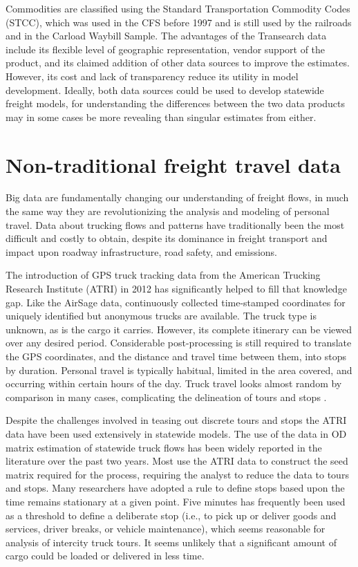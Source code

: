 Commodities are classified using the Standard Transportation Commodity Codes (STCC), which was used in the CFS before 1997 and is still used by the railroads and in the Carload Waybill Sample. The advantages of the Transearch data include its flexible level of geographic representation, vendor support of the product, and its claimed addition of other data sources to improve the estimates. However, its cost and lack of transparency reduce its utility in model development. Ideally, both data sources could be used to develop statewide freight models, for understanding the differences between the two data products may in some cases be more revealing than singular estimates from either.

\section{Non-traditional freight travel data}\label{sec:nontraditional-freight}

Big data are fundamentally changing our understanding of freight flows, in much the same way they are revolutionizing the analysis and modeling of personal travel. Data about trucking flows and patterns have traditionally been the most difficult and costly to obtain, despite its dominance in freight transport and impact upon roadway infrastructure, road safety, and emissions. 

The introduction of GPS truck tracking data from the American Trucking Research Institute (ATRI) in 2012 has significantly helped to fill that knowledge gap. Like the AirSage data, continuously collected time-stamped coordinates for uniquely identified but anonymous trucks are available. The truck type is unknown, as is the cargo it carries. However, its complete itinerary can be viewed over any desired period. Considerable post-processing is still required to translate the GPS coordinates, and the distance and travel time between them, into stops by duration. Personal travel is typically habitual, limited in the area covered, and occurring within certain hours of the day. Truck travel looks almost random by comparison in many cases, complicating the delineation of tours and stops \citep{sharman11}.

Despite the challenges involved in teasing out discrete tours and stops the ATRI data have been used extensively in statewide models. The use of the data in OD matrix estimation of statewide truck flows has been widely reported in the literature over the past two years. Most use the ATRI data to construct the seed matrix required for the process, requiring the analyst to reduce the data to tours and stops. Many researchers have adopted a rule to define stops based upon the time remains stationary at a given point. Five minutes has frequently been used as a threshold to define a deliberate stop (i.e., to pick up or deliver goods and services, driver breaks, or vehicle maintenance), which seems reasonable for analysis of intercity truck tours. It seems unlikely that a significant amount of cargo could be loaded or delivered in less time.

